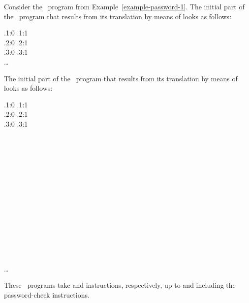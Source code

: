 \documentclass[fleqn]{llncs}
\begin{document}
\begin{example}
Consider the \PGLDdii\ program from Example~\ref{example-password-1}.
The initial part of the \PGLD\ program that results from its translation
by means of  looks as follows:
\begin{ldispl}
 \conc {} \conc
\rfdt.\setr{:}1{:}0 \conc {} \conc \rfdt.\setr{:}1{:}1 \conc {} \\
 \conc {} \conc
\rfdt.\setr{:}2{:}0 \conc {} \conc \rfdt.\setr{:}2{:}1 \conc {} \\
 \conc {} \conc
\rfdt.\setr{:}3{:}0 \conc {} \conc \rfdt.\setr{:}3{:}1 \conc {} \\
 \conc \ldots
\end{ldispl}The initial part of the \PGLD\ program that results from its translation
by means of  looks as follows:
\begin{ldispl}
 \conc {} \conc
\rf.\setr{:}1{:}0 \conc {} \conc \rf.\setr{:}1{:}1 \conc {} \\
 \conc {} \conc
\rf.\setr{:}2{:}0 \conc {} \conc \rf.\setr{:}2{:}1 \conc {} \\
 \conc {} \conc
\rf.\setr{:}3{:}0 \conc {} \conc \rf.\setr{:}3{:}1 \conc {} \\
 \conc
{} \conc {} \conc {} \\
 \conc
{} \conc {} \conc {} \\
 \conc
{} \conc {} \conc {} \\
 \conc
{} \conc {} \conc {} \\
 \conc
{} \conc {} \conc {} \\
 \conc
{} \conc {} \conc {} \\
 \conc
{} \conc {} \conc {} \\
 \conc
{} \conc {} \conc {} \\
 \conc
{} \conc {} \conc {} \\
 \conc
{} \conc {} \conc {} \\
 \conc
{} \conc {} \conc {} \\
 \conc
{} \conc {} \conc {} \\
 \conc
{} \conc {} \conc {} \\
 \conc
{} \conc {} \conc {} \\
 \conc {} \ldots
\end{ldispl}These \PGLD\ programs take  and  instructions, respectively, up
to and including the password-check instructions.


\end{example}
\end{document}
